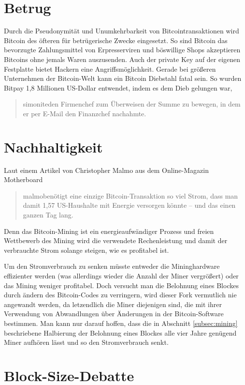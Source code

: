 \section{Betrug}

Durch die Pseudonymität und Unumkehrbarkeit von Bitcointransaktionen wird Bitcoin des öfteren für betrügerische Zwecke eingesetzt.
So sind Bitcoin das bevorzugte Zahlungsmittel von Erpresserviren und böswillige Shops akzeptieren Bitcoins ohne jemals Waren auszusenden.
Auch der private Key auf der eigenen Festplatte bietet Hackern eine Angriffsmöglichkeit.
Gerade bei größeren Unternehmen der Bitcoin-Welt kann ein Bitcoin Diebstahl fatal sein.
So wurden Bitpay 1,8 Millionen US-Dollar entwendet, indem es dem Dieb gelungen war, \begin{quote}{simonite}den Firmenchef zum Überweisen der Summe zu bewegen, in dem er per E-Mail den Finanzchef nachahmte.\end{quote}

\section{Nachhaltigkeit}

Laut einem Artikel von Christopher Malmo aus dem Online-Magazin Motherboard \begin{quote}{malmo}benötigt eine einzige Bitcoin-Transaktion so viel Strom, dass man damit 1,57 US-Haushalte mit Energie versorgen könnte -- und das einen ganzen Tag lang.\end{quote}
Denn das Bitcoin-Mining ist ein energieaufwändiger Prozess und freien Wettbewerb des Mining wird die verwendete Rechenleistung und damit der verbrauchte Strom solange steigen, wie es profitabel ist.

Um den Stromverbrauch zu senken müsste entweder die Mininghardware effizienter werden (was allerdings wieder die Anzahl der Miner vergrößert) oder das Mining weniger profitabel.
Doch versucht man die Belohnung eines Blockes durch ändern des Bitcoin-Codes zu verringern, wird dieser Fork vermutlich nie angewandt werden, da letzendlich die Miner diejenigen sind, die mit ihrer Verwendung von Abwandlungen über Änderungen in der Bitcoin-Software bestimmen.
Man kann nur darauf hoffen, dass die in Abschnitt \ref{subsec:mining} beschriebene Halbierung der Belohnung eines Blockes alle vier Jahre genügend Miner aufhören lässt und so den Stromverbrauch senkt.

\section{Block-Size-Debatte}

